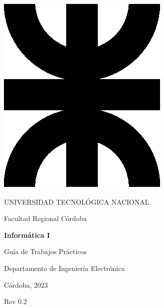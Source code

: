 \thispagestyle{empty}

\begin{center}

\includegraphics[scale=.3]{img/utn.eps}

\medskip
UNIVERSIDAD TECNOLÓGICA NACIONAL

Facultad Regional Córdoba

\vspace{3cm}

\textbf{
  \huge
  Informática I
}

\vspace{2cm}

\LARGE{Guía de Trabajos Prácticos}

\vfill

Departamento de Ingeniería Electrónica

\vspace{1cm}

Córdoba, 2023

\vspace{1cm}

Rev 0.2

\end{center}


